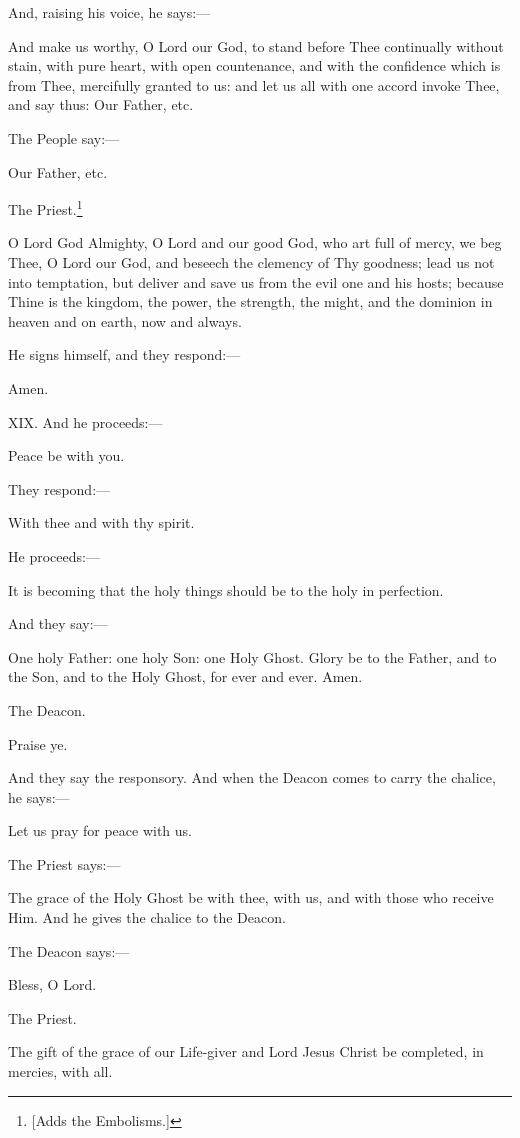 And, raising his voice, he says:—

And make us worthy, O Lord our God, to stand before Thee continually without stain, with pure heart, with open countenance, and with the confidence which is from Thee, mercifully granted to us: and let us all with one accord invoke Thee, and say thus: Our Father, etc.

The People say:—

Our Father, etc.

The Priest.\footnote{\par{}  [Adds the Embolisms.]}

O Lord God Almighty, O Lord and our good God, who art full of mercy, we beg Thee, O Lord our God, and beseech the clemency of Thy goodness; lead us not into temptation, but deliver and save us from the evil one and his hosts; because Thine is the kingdom, the power, the strength, the might, and the dominion in heaven and on earth, now and always.

He signs himself, and they respond:—

Amen.

XIX. And he proceeds:—

Peace be with you.

They respond:—

With thee and with thy spirit.

He proceeds:—

It is becoming that the holy things should be to the holy in perfection.

And they say:—

One holy Father: one holy Son: one Holy Ghost. Glory be to the Father, and to the Son, and to the Holy Ghost, for ever and ever. Amen.

The Deacon.

Praise ye.

And they say the responsory. And when the Deacon comes to carry the chalice, he says:—

Let us pray for peace with us.

The Priest says:—

The grace of the Holy Ghost be with thee, with us, and with those who receive Him. And he gives the chalice to the Deacon.

The Deacon says:—

Bless, O Lord.

The Priest.

The gift of the grace of our Life-giver and Lord Jesus Christ be completed, in mercies, with all.

